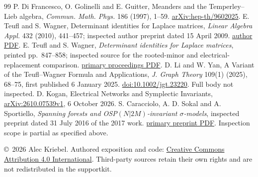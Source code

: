 \documentclass[11pt]{article}
\begin{document}
\begin{thebibliography}{99}
 P. Di Francesco, O. Golinelli and E. Guitter, Meanders and the Temperley--Lieb algebra, \emph{Commun. Math. Phys.} 186 (1997), 1--59. \href{https://arxiv.org/abs/hep-th/9602025}{arXiv:hep-th/9602025}.
 E. Teufl and S. Wagner, Determinant identities for Laplace matrices, \emph{Linear Algebra Appl.} 432 (2010), 441--457; inspected author preprint dated 15 April 2009. \href{https://math.sun.ac.za/swagner/determinant.pdf}{author PDF}.
 E. Teufl and S. Wagner, \emph{Determinant identities for Laplace matrices}, printed pp.~847--858; inspected source for the rooted-minor and electrical-replacement comparison. \href{https://dmtcs.episciences.org/2699/pdf}{primary proceedings PDF}.
 D. Li and W. Yan, A Variant of the Teufl--Wagner Formula and Applications, \emph{J. Graph Theory} 109(1) (2025), 68--75, first published 6 January 2025. \href{https://doi.org/10.1002/jgt.23220}{doi:10.1002/jgt.23220}. Full body not inspected.
 D. Kogan, Electrical Networks and Symplectic Invariants, \href{https://arxiv.org/pdf/2610.07539v1}{arXiv:2610.07539v1}, 6 October 2026.
 S. Caracciolo, A. D. Sokal and A. Sportiello, \emph{Spanning forests and OSP$(N|2M)$-invariant $\sigma$-models}, inspected preprint dated 31 July 2016 of the 2017 work. \href{https://discovery.ucl.ac.uk/10025167/1/forests_ON_v3gA.pdf}{primary preprint PDF}. Inspection scope is partial as specified above.
\end{thebibliography}
\vfill\noindent\small\copyright\ 2026 Alec Kriebel. Authored exposition and code: \href{https://creativecommons.org/licenses/by/4.0/}{Creative Commons Attribution 4.0 International}. Third-party sources retain their own rights and are not redistributed in the supportkit.
\end{document}
